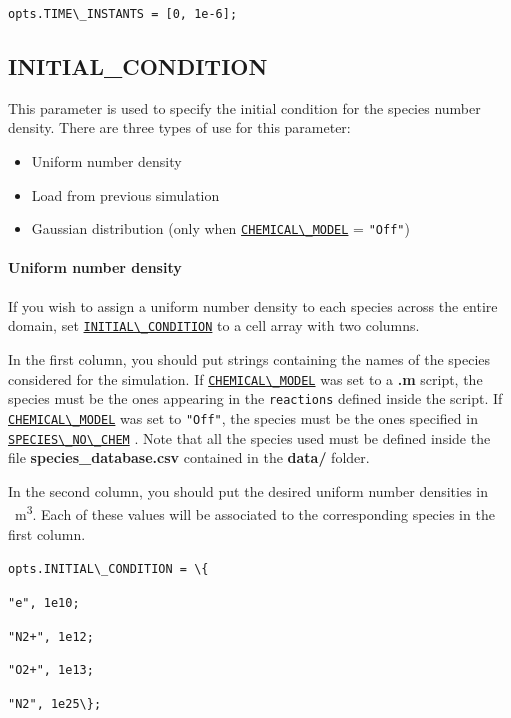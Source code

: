 \documentclass[12pt,a4paper]{article}
\newcommand{\matlabs}[1]{{\lstinline[style=MatlabStyle]!#1!}}
\newcommand{\seclink}[2]{%
	\begingroup
	\hypersetup{linkcolor=orange}%
	\hyperref[sec:#1]{\matlabs{#2}}%
	\endgroup
}
\begin{document}
	\matlabs{opts.TIME\_INSTANTS = [0, 1e-6];}
	
	\subsection{INITIAL\_CONDITION}
	\label{sec:initial}
	This parameter is used to specify the initial condition for the species number density. There are three types of use for this parameter:
	\begin{itemize}
		\item Uniform number density 
		\item Load from previous simulation
		\item Gaussian distribution (only when \seclink{chemicalmodel}{CHEMICAL\_MODEL} = \matlabs{"Off"})
	\end{itemize}
	
	\paragraph{Uniform number density}
	If you wish to assign a uniform number density to each species across the entire domain, set \seclink{initial}{INITIAL\_CONDITION} to a cell array with two columns.
	
	In the first column, you should put strings containing the names of the species considered for the simulation. If \seclink{chemicalmodel}{CHEMICAL\_MODEL} was set to a \textbf{.m} script, the species must be the ones appearing in the \matlabs{reactions} defined inside the script.
	If \seclink{chemicalmodel}{CHEMICAL\_MODEL} was set to \matlabs{"Off"}, the species must be the ones specified in \seclink{speciesnochem}{SPECIES\_NO\_CHEM}. Note that all the species used must be defined inside the file \textbf{species\_database.csv} contained in the \textbf{data/} folder.
	
	In the second column, you should put the desired uniform number densities in \unit{\per\cubic\meter}. Each of these values will be associated to the corresponding species in the first column. 
	
	\matlabs{opts.INITIAL\_CONDITION = \{}
	
	\hspace{40pt} \matlabs{"e", 1e10;}
	
	\hspace{40pt} \matlabs{"N2+", 1e12;}
	
	\hspace{40pt} \matlabs{"O2+", 1e13;}
	
	\hspace{40pt} \matlabs{"N2", 1e25\};}
	
\end{document}
